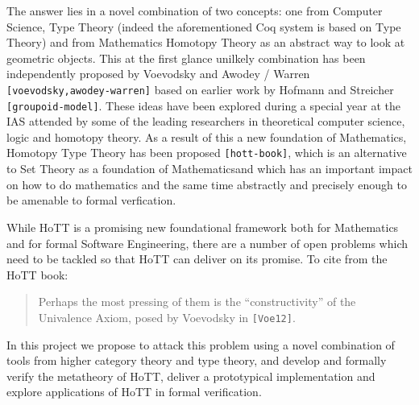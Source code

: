 \documentclass[twocolumn,a4paper,11pt]{article}
\renewcommand{\cite}[1]{{\tt[#1]}}
\begin{document}
The answer lies in a novel combination of two concepts: one from
Computer Science, Type Theory (indeed the aforementioned Coq system is
based on Type Theory) and from Mathematics Homotopy Theory as an
abstract way to look at geometric objects. This at the first glance
unilkely combination has been independently proposed by Voevodsky and
Awodey / Warren \cite{voevodsky,awodey-warren} based on earlier work by Hofmann and
Streicher \cite{groupoid-model}. These ideas have
been explored during a special year at the IAS attended by some of the
leading researchers in theoretical computer science, logic and
homotopy theory. As a result of this a new foundation of Mathematics,
Homotopy Type Theory has been proposed \cite{hott-book}, which is an
alternative to
Set Theory as a foundation of Mathematicsand which has an important impact on how to do mathematics
and the same time abstractly and precisely enough to be amenable to
formal verfication.  

While HoTT is a promising new foundational framework both for
Mathematics and for formal Software Engineering, there are a number of
open problems which need to be tackled so that HoTT can deliver on its
promise. To cite from the HoTT book:
\begin{quote}
  Perhaps the most pressing of them is the “constructivity” of the
  Univalence Axiom, posed by Voevodsky in \cite{Voe12}.
\end{quote}
In this project we propose to attack this problem using a
novel combination of tools from higher category theory and type
theory, and  develop and formally verify the metatheory of
HoTT, deliver a prototypical implementation and explore applications
of HoTT in formal verification.


\end{document}
